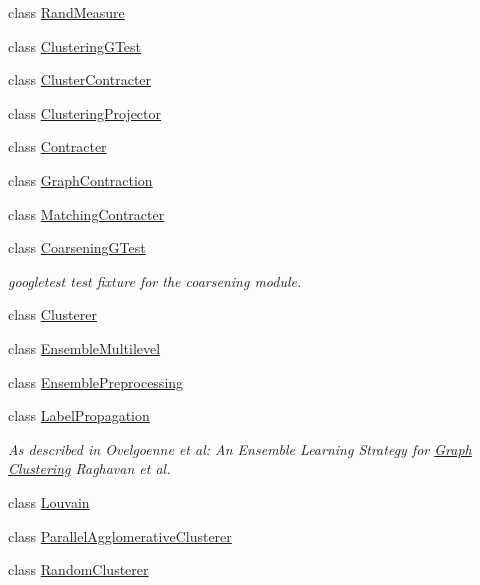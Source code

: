 \begin{DoxyCompactItemize}
class \hyperlink{class_ensemble_clustering_1_1_rand_measure}{Rand\-Measure}
\item 
class \hyperlink{class_ensemble_clustering_1_1_clustering_g_test}{Clustering\-G\-Test}
\item 
class \hyperlink{class_ensemble_clustering_1_1_cluster_contracter}{Cluster\-Contracter}
\item 
class \hyperlink{class_ensemble_clustering_1_1_clustering_projector}{Clustering\-Projector}
\item 
class \hyperlink{class_ensemble_clustering_1_1_contracter}{Contracter}
\item 
class \hyperlink{class_ensemble_clustering_1_1_graph_contraction}{Graph\-Contraction}
\item 
class \hyperlink{class_ensemble_clustering_1_1_matching_contracter}{Matching\-Contracter}
\item 
class \hyperlink{class_ensemble_clustering_1_1_coarsening_g_test}{Coarsening\-G\-Test}
\begin{DoxyCompactList}\small\item\em googletest test fixture for the coarsening module. \end{DoxyCompactList}\item 
class \hyperlink{class_ensemble_clustering_1_1_clusterer}{Clusterer}
\item 
class \hyperlink{class_ensemble_clustering_1_1_ensemble_multilevel}{Ensemble\-Multilevel}
\item 
class \hyperlink{class_ensemble_clustering_1_1_ensemble_preprocessing}{Ensemble\-Preprocessing}
\item 
class \hyperlink{class_ensemble_clustering_1_1_label_propagation}{Label\-Propagation}
\begin{DoxyCompactList}\small\item\em As described in Ovelgoenne et al\-: An Ensemble Learning Strategy for \hyperlink{class_ensemble_clustering_1_1_graph}{Graph} \hyperlink{class_ensemble_clustering_1_1_clustering}{Clustering} Raghavan et al. \end{DoxyCompactList}\item 
class \hyperlink{class_ensemble_clustering_1_1_louvain}{Louvain}
\item 
class \hyperlink{class_ensemble_clustering_1_1_parallel_agglomerative_clusterer}{Parallel\-Agglomerative\-Clusterer}
\item 
class \hyperlink{class_ensemble_clustering_1_1_random_clusterer}{Random\-Clusterer}
\item 

\end{DoxyCompactItemize}

